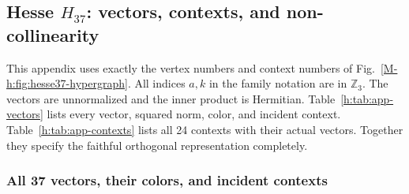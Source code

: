 \documentclass[aps,pra,reprint,superscriptaddress,longbibliography,nofootinbib,floatfix,10pt]{revtex4-2}
\theoremstyle{definition}
\newcommand{\Z}{\mathbb{Z}}
\begin{document}
\FloatBarrier
\subsection{\texorpdfstring{Hesse $H_{37}$: vectors, contexts, and non-collinearity}{Hesse H37: vectors, contexts, and non-collinearity}}\label{h:app:vectors-contexts}

This appendix uses exactly the vertex numbers and context numbers of Fig.~\ref{M-h:fig:hesse37-hypergraph}. All indices $a,k$ in the family notation are in $\Z_3$. The vectors are unnormalized and the inner product is Hermitian. Table~\ref{h:tab:app-vectors} lists every vector, squared norm, color, and incident context. Table~\ref{h:tab:app-contexts} lists all 24 contexts with their actual vectors. Together they specify the faithful orthogonal representation completely.

\subsubsection{All 37 vectors, their colors, and incident contexts}
\end{document}
